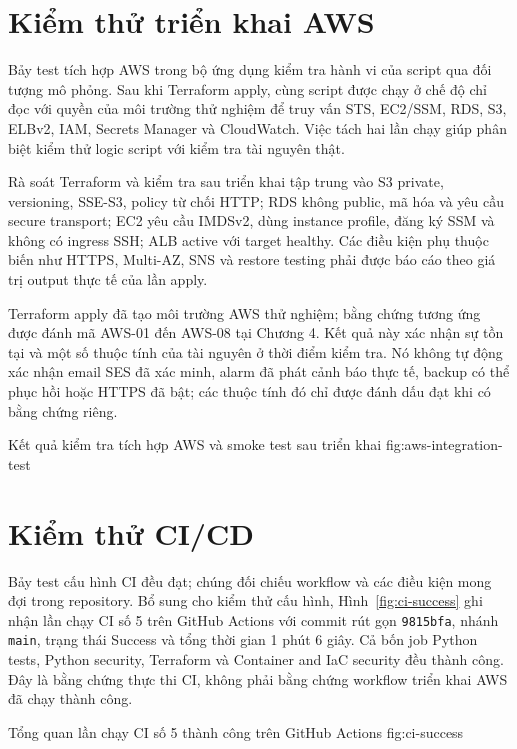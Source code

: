 \section{Kiểm thử triển khai AWS}
Bảy test tích hợp AWS trong bộ ứng dụng kiểm tra hành vi của script qua đối tượng mô phỏng. Sau khi Terraform apply, cùng script được chạy ở chế độ chỉ đọc với quyền của môi trường thử nghiệm để truy vấn STS, EC2/SSM, RDS, S3, ELBv2, IAM, Secrets Manager và CloudWatch. Việc tách hai lần chạy giúp phân biệt kiểm thử logic script với kiểm tra tài nguyên thật.

Rà soát Terraform và kiểm tra sau triển khai tập trung vào S3 private, versioning, SSE-S3, policy từ chối HTTP; RDS không public, mã hóa và yêu cầu secure transport; EC2 yêu cầu IMDSv2, dùng instance profile, đăng ký SSM và không có ingress SSH; ALB active với target healthy. Các điều kiện phụ thuộc biến như HTTPS, Multi-AZ, SNS và restore testing phải được báo cáo theo giá trị output thực tế của lần apply.

Terraform apply đã tạo môi trường AWS thử nghiệm; bằng chứng tương ứng được đánh mã AWS-01 đến AWS-08 tại Chương 4. Kết quả này xác nhận sự tồn tại và một số thuộc tính của tài nguyên ở thời điểm kiểm tra. Nó không tự động xác nhận email SES đã xác minh, alarm đã phát cảnh báo thực tế, backup có thể phục hồi hoặc HTTPS đã bật; các thuộc tính đó chỉ được đánh dấu đạt khi có bằng chứng riêng.

{Kết quả kiểm tra tích hợp AWS và smoke test sau triển khai}
{fig:aws-integration-test}

\section{Kiểm thử CI/CD}
Bảy test cấu hình CI đều đạt; chúng đối chiếu workflow và các điều kiện mong đợi trong repository. Bổ sung cho kiểm thử cấu hình, Hình~\ref{fig:ci-success} ghi nhận lần chạy CI số 5 trên GitHub Actions với commit rút gọn \texttt{9815bfa}, nhánh \texttt{main}, trạng thái Success và tổng thời gian 1 phút 6 giây. Cả bốn job Python tests, Python security, Terraform và Container and IaC security đều thành công. Đây là bằng chứng thực thi CI, không phải bằng chứng workflow triển khai AWS đã chạy thành công.

{Tổng quan lần chạy CI số 5 thành công trên GitHub Actions}
{fig:ci-success}

